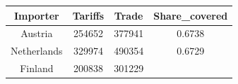\documentclass[10pt,]{article}
\begin{document}
\begin{longtable}[]{@{}cccc@{}}
\toprule
\begin{minipage}[b]{0.26\columnwidth}\centering\strut
Importer\strut
\end{minipage} & \begin{minipage}[b]{0.12\columnwidth}\centering\strut
Tariffs\strut
\end{minipage} & \begin{minipage}[b]{0.10\columnwidth}\centering\strut
Trade\strut
\end{minipage} & \begin{minipage}[b]{0.18\columnwidth}\centering\strut
Share\_covered\strut
\end{minipage}\tabularnewline
\midrule
\endhead
\begin{minipage}[t]{0.26\columnwidth}\centering\strut
Austria\strut
\end{minipage} & \begin{minipage}[t]{0.12\columnwidth}\centering\strut
254652\strut
\end{minipage} & \begin{minipage}[t]{0.10\columnwidth}\centering\strut
377941\strut
\end{minipage} & \begin{minipage}[t]{0.18\columnwidth}\centering\strut
0.6738\strut
\end{minipage}\tabularnewline
\begin{minipage}[t]{0.26\columnwidth}\centering\strut
Netherlands\strut
\end{minipage} & \begin{minipage}[t]{0.12\columnwidth}\centering\strut
329974\strut
\end{minipage} & \begin{minipage}[t]{0.10\columnwidth}\centering\strut
490354\strut
\end{minipage} & \begin{minipage}[t]{0.18\columnwidth}\centering\strut
0.6729\strut
\end{minipage}\tabularnewline
\begin{minipage}[t]{0.26\columnwidth}\centering\strut
Finland\strut
\end{minipage} & \begin{minipage}[t]{0.12\columnwidth}\centering\strut
200838\strut
\end{minipage} & \begin{minipage}[t]{0.10\columnwidth}\centering\strut
301229\strut
\end{minipage} & \begin{minipage}[t]{0.18\columnwidth}\centering\strut

\end{minipage}
\end{longtable}
\end{document}
